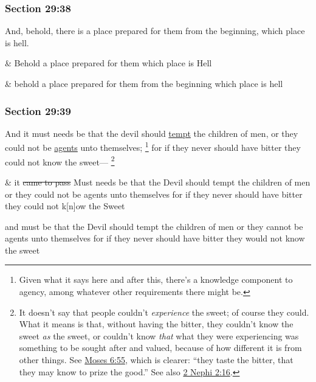 	\subsubsection{Section 29:38} %
		\label{DC29-38}

		And, behold, there is a place prepared for them from the beginning, which place is hell.

		\begin{framed}
		\scriptsize
			\begin{compactdesc}
				\item[JSP] \& Behold a place prepared for them which place is Hell
				\item[HSN] \& behold a place prepared for them from the beginning which place is hell
			\end{compactdesc}
		\end{framed}

	\subsubsection{Section 29:39} %
		\label{DC29-39}

		And it must needs be that the devil should \hyperref[TEMPTATION]{tempt} the children of men, or they could not be \hyperref[AGENCY]{agents} unto themselves;%
		\footnote{%
			Given what it says here and after this, there's a knowledge component to agency, among whatever other requirements there might be.
			} 
		for if they never should have bitter they could not know the sweet---%
			\footnote{%
				It doesn't say that people couldn't \textit{experience} the sweet; of course they could. What it means is that, without having the bitter, they couldn't know the sweet \textit{as} the sweet, or couldn't know \textit{that} what they were experiencing was something to be sought after and valued, because of how different it is from other things. See \hyperref[MOSES-6-55]{Moses 6:55}, which is clearer: ``they taste the bitter, that they may know to prize the good.'' See also \hyperref[2NEPHI-2-16]{2 Nephi 2:16}.
				}

		\begin{framed}
		\scriptsize
			\begin{compactdesc}
				\item[JSP] \& it \sout{came to pass} Must needs be that the Devil should tempt the children of men or they could not be agents unto themselves for if they never should have bitter they could not k[n]ow the Sweet
				\item[HSN] and must be that the Devil should tempt the children of men or they cannot be agents unto themselves for if they never should have bitter they would not know the sweet
			\end{compactdesc}
		\end{framed}

